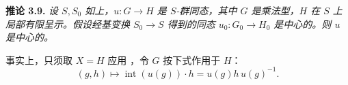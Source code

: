 \medskip
\noindent{}\textbf{推论 3.9.}
\textit{设 \(S,S_0\) 如上，\(u:G\to H\) 是 \(S\)-群同态，其中 \(G\) 是乘法型，\(H\) 在 \(S\) 上局部有限呈示。假设经基变换 \(S_0\to S\) 得到的同态 \(u_0:G_0\to H_0\) 是中心的。则 \(u\) 是中心的。}

事实上，只须取 \(X=H\) 应用 ，令 \(G\) 按下式作用于 \(H\)：
\[
  (g,h)\longmapsto\operatorname{int}(u(g))\cdot h
  =u(g)h\,u(g)^{-1}.
\]

